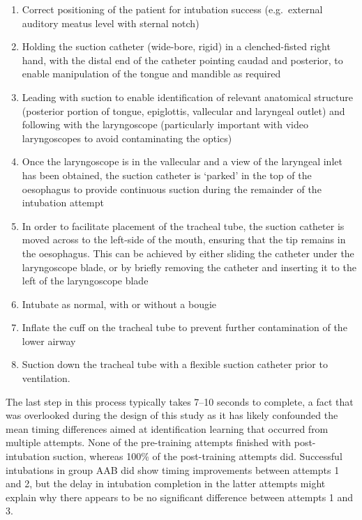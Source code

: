 \documentclass[]{article}
\providecommand{\tightlist}{%
  \setlength{\itemsep}{0pt}\setlength{\parskip}{0pt}}
\begin{document}
\begin{enumerate}
\def\labelenumi{\arabic{enumi}.}
\tightlist
\item
  Correct positioning of the patient for intubation success
  (e.g.~external auditory meatus level with sternal notch)
\item
  Holding the suction catheter (wide-bore, rigid) in a clenched-fisted
  right hand, with the distal end of the catheter pointing caudad and
  posterior, to enable manipulation of the tongue and mandible as
  required
\item
  Leading with suction to enable identification of relevant anatomical
  structure (posterior portion of tongue, epiglottis, vallecular and
  laryngeal outlet) and following with the laryngoscope (particularly
  important with video laryngoscopes to avoid contaminating the optics)
\item
  Once the laryngoscope is in the vallecular and a view of the laryngeal
  inlet has been obtained, the suction catheter is `parked' in the top
  of the oesophagus to provide continuous suction during the remainder
  of the intubation attempt
\item
  In order to facilitate placement of the tracheal tube, the suction
  catheter is moved across to the left-side of the mouth, ensuring that
  the tip remains in the oesophagus. This can be achieved by either
  sliding the catheter under the laryngoscope blade, or by briefly
  removing the catheter and inserting it to the left of the laryngoscope
  blade
\item
  Intubate as normal, with or without a bougie
\item
  Inflate the cuff on the tracheal tube to prevent further contamination
  of the lower airway
\item
  Suction down the tracheal tube with a flexible suction catheter prior
  to ventilation.
\end{enumerate}

The last step in this process typically takes 7--10 seconds to complete,
a fact that was overlooked during the design of this study as it has
likely confounded the mean timing differences aimed at identification
learning that occurred from multiple attempts. None of the pre-training
attempts finished with post-intubation suction, whereas 100\% of the
post-training attempts did. Successful intubations in group AAB did show
timing improvements between attempts 1 and 2, but the delay in
intubation completion in the latter attempts might explain why there
appears to be no significant difference between attempts 1 and 3.
\end{document}
